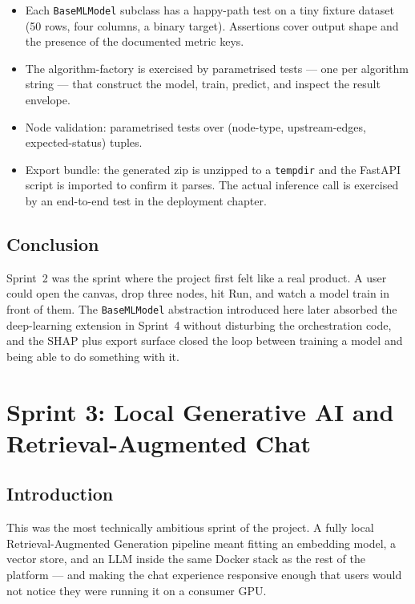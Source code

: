 \documentclass[12pt, a4paper, oneside]{report}
\begin{document}
\begin{itemize}
    \item Each \texttt{BaseMLModel} subclass has a happy-path test on
        a tiny fixture dataset (50 rows, four columns, a binary
        target). Assertions cover output shape and the presence of
        the documented metric keys.
    \item The algorithm-factory is exercised by parametrised tests
        --- one per algorithm string --- that construct the model,
        train, predict, and inspect the result envelope.
    \item Node validation: parametrised tests over
        (node-type, upstream-edges, expected-status) tuples.
    \item Export bundle: the generated zip is unzipped to a
        \texttt{tempdir} and the FastAPI script is imported to
        confirm it parses. The actual inference call is exercised
        by an end-to-end test in the deployment chapter.
\end{itemize}

\section*{Conclusion}

Sprint~2 was the sprint where the project first felt like a real
product. A user could open the canvas, drop three nodes, hit Run,
and watch a model train in front of them. The \texttt{BaseMLModel}
abstraction introduced here later absorbed the deep-learning
extension in Sprint~4 without disturbing the orchestration code, and
the SHAP plus export surface closed the loop between training a
model and being able to do something with it.

\chapter{Sprint 3: Local Generative AI and Retrieval-Augmented Chat}

\section*{Introduction}

This was the most technically ambitious sprint of the project. A
fully local Retrieval-Augmented Generation pipeline meant fitting an
embedding model, a vector store, and an LLM inside the same Docker
stack as the rest of the platform --- and making the chat experience
responsive enough that users would not notice they were running it
on a consumer GPU.
\end{document}
